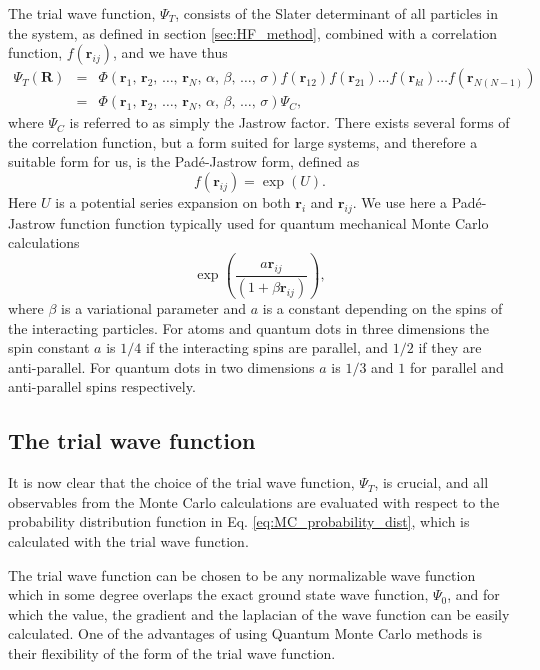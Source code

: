 		The trial wave function, $\Psi_T$, consists of the Slater determinant of all particles in the system, as defined in section \ref{sec:HF_method}, combined with a correlation function, $f\left( \mathbf{r}_{ij} \right)$, and we have thus
		\begin{eqnarray*}
			\Psi_{T}(\mathbf{R}) & = & \Phi\left(\mathbf{r}_{1},\, \mathbf{r}_{2},\,\dots,\, \mathbf{r}_{N},\,\alpha,\,\beta,\,\dots,\,\sigma\right)f\left( \mathbf{r}_{12} \right)f\left( \mathbf{r}_{21} \right)\dots f\left( \mathbf{r}_{kl} \right)\dots f\left( \mathbf{r}_{N(N-1)} \right) \\
								& = & \Phi\left(\mathbf{r}_{1},\, \mathbf{r}_{2},\,\dots,\, \mathbf{r}_{N},\,\alpha,\,\beta,\,\dots,\,\sigma\right) \Psi_{C},
		\end{eqnarray*}
		where $\Psi_{C}$ is referred to as simply the Jastrow factor. There exists several forms of the correlation function, but a form suited for large systems, and therefore a suitable form for us, is the Padé-Jastrow form, defined as
		\begin{equation}
			f\left( \mathbf{r}_{ij} \right) = \exp\left(U \right).
		\end{equation}
		Here $U$ is a potential series expansion on both $\mathbf{r}_i$ and $\mathbf{r}_{ij}$. We use here a Padé-Jastrow function function typically used for quantum mechanical Monte Carlo calculations
		\begin{equation}
			\exp\left( \frac{a\mathbf{r}_{ij}}{(1+\beta \mathbf{r}_{ij})} \right),
		\end{equation}
		where $\beta$ is a variational parameter and $a$ is a constant depending on the spins of the interacting particles. For atoms and quantum dots in three dimensions the spin constant $a$ is $1/4$ if the interacting spins are parallel, and $1/2$ if they are anti-parallel. For quantum dots in two dimensions $a$ is $1/3$ and $1$ for parallel and anti-parallel spins respectively.

		\subsection{The trial wave function}
			It is now clear that the choice of the trial wave function, $\Psi_T$, is crucial, and all observables from the Monte Carlo calculations are evaluated with respect to the probability distribution function in Eq. \eqref{eq:MC_probability_dist}, which is calculated with the trial wave function. 

			The trial wave function can be chosen to be any normalizable wave function which in some degree overlaps the exact ground state wave function, $\Psi_0$, and for which the value, the gradient and the laplacian of the wave function can be easily calculated. One of the advantages of using Quantum Monte Carlo methods is their flexibility of the form of the trial wave function. 

